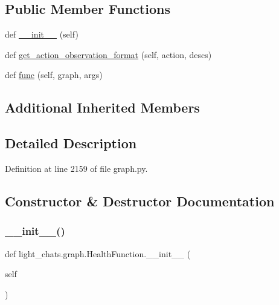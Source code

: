 \subsection*{Public Member Functions}
\begin{DoxyCompactItemize}
\item 
def \hyperlink{classlight__chats_1_1graph_1_1HealthFunction_a523a336bf9edf8f3fd8bc2afa400e633}{\+\_\+\+\_\+init\+\_\+\+\_\+} (self)
\item 
def \hyperlink{classlight__chats_1_1graph_1_1HealthFunction_a436cadbb6f2ae2cb77521c013caa8063}{get\+\_\+action\+\_\+observation\+\_\+format} (self, action, descs)
\item 
def \hyperlink{classlight__chats_1_1graph_1_1HealthFunction_aa79079c84c63fb936ef8ed5afa5bafca}{func} (self, graph, args)
\end{DoxyCompactItemize}
\subsection*{Additional Inherited Members}


\subsection{Detailed Description}


Definition at line 2159 of file graph.\+py.



\subsection{Constructor \& Destructor Documentation}
\mbox{\label{classlight__chats_1_1graph_1_1HealthFunction_a523a336bf9edf8f3fd8bc2afa400e633}} 
\subsubsection{\texorpdfstring{\+\_\+\+\_\+init\+\_\+\+\_\+()}{\_\_init\_\_()}}
{\footnotesize\ttfamily def light\+\_\+chats.\+graph.\+Health\+Function.\+\_\+\+\_\+init\+\_\+\+\_\+ (\begin{DoxyParamCaption}\item[{}]{self }\end{DoxyParamCaption})}




